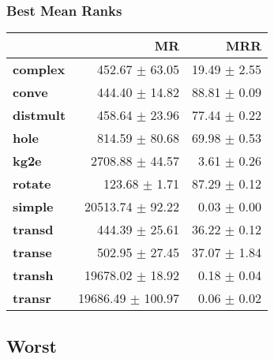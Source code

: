 \documentclass{article}
\begin{document}
    \subsubsection{Best Mean Ranks}
    \begin{center}
    \begin{tabular}{lrr}
\toprule
{} &                 MR &           MRR \\
\midrule
\textbf{complex } &     452.67 $\pm$ 63.05 &  19.49 $\pm$ 2.55 \\
\textbf{conve   } &     444.40 $\pm$ 14.82 &  88.81 $\pm$ 0.09 \\
\textbf{distmult} &     458.64 $\pm$ 23.96 &  77.44 $\pm$ 0.22 \\
\textbf{hole    } &     814.59 $\pm$ 80.68 &  69.98 $\pm$ 0.53 \\
\textbf{kg2e    } &    2708.88 $\pm$ 44.57 &   3.61 $\pm$ 0.26 \\
\textbf{rotate  } &      123.68 $\pm$ 1.71 &  87.29 $\pm$ 0.12 \\
\textbf{simple  } &   20513.74 $\pm$ 92.22 &   0.03 $\pm$ 0.00 \\
\textbf{transd  } &     444.39 $\pm$ 25.61 &  36.22 $\pm$ 0.12 \\
\textbf{transe  } &     502.95 $\pm$ 27.45 &  37.07 $\pm$ 1.84 \\
\textbf{transh  } &   19678.02 $\pm$ 18.92 &   0.18 $\pm$ 0.04 \\
\textbf{transr  } &  19686.49 $\pm$ 100.97 &   0.06 $\pm$ 0.02 \\
\bottomrule
\end{tabular}

    \end{center}
    \subsection{Worst}
\end{document}
